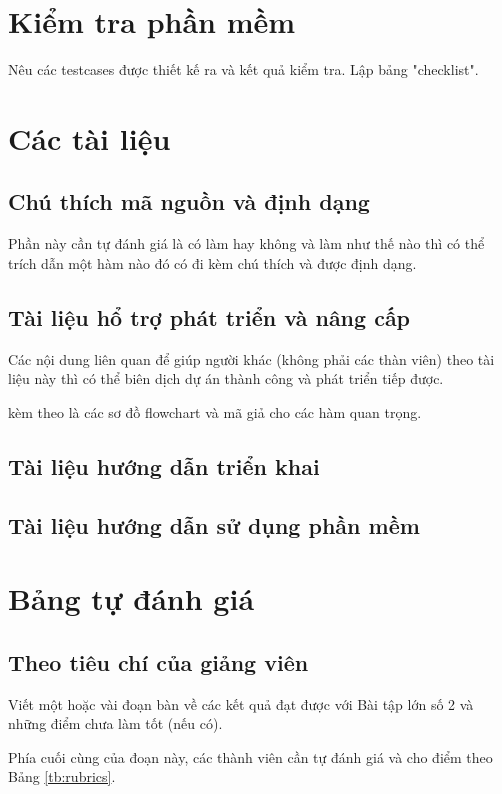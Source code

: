 \documentclass[a4paper]{article}
\begin{document}
\section{Kiểm tra phần mềm}
Nêu các testcases được thiết kế ra và kết quả kiểm tra. Lập bảng "checklist".

\section{Các tài liệu}
\subsection{Chú thích mã nguồn và định dạng}
Phần này cần tự đánh giá là có làm hay không và làm như thế nào thì có thể trích dẫn một hàm nào đó có đi kèm chú thích và được định dạng.
\subsection{Tài liệu hổ trợ phát triển và nâng cấp}
Các nội dung liên quan để giúp người khác (không phải các thàn viên) theo tài liệu này thì có thể biên dịch dự án thành công và phát triển tiếp được.


kèm theo là các sơ đồ flowchart và mã giả cho các hàm quan trọng.

\subsection{Tài liệu hướng dẫn triển khai}
\subsection{Tài liệu hướng dẫn sử dụng phần mềm}


\section{Bảng tự đánh giá}
\subsection{Theo tiêu chí của giảng viên}
Viết một hoặc vài đoạn bàn về các kết quả đạt được với Bài tập lớn số 2 và những điểm chưa làm tốt (nếu có).

Phía cuối cùng của đoạn này, các thành viên cần tự đánh giá và cho điểm theo Bảng \ref{tb:rubrics}.
\end{document}
